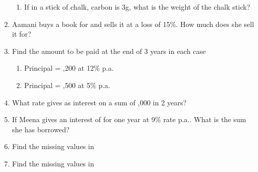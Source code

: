 \begin{enumerate}[label=\thesubsection.\arabic*,ref=\thesubsection.\theenumi,resume*]
\begin{enumerate}
		\item  If in a stick of chalk, carbon is 3g, what is the weight of the chalk stick?
	\end{enumerate}
\item Aamani buys a book for  and sells it at a loss of 15\%. How much does she sell it for?
\item  Find the amount to be paid at the end of 3 years in each case
	\begin{enumerate}
\item  Principal = ,200 at 12\% p.a.
\item  Principal = ,500 at 5\% p.a.
	\end{enumerate}
\item  What rate gives  as interest on a sum of ,000 in 2 years? 
\item  If Meena gives an interest of  for one year at 9\% rate p.a.. What is the sum she has borrowed?
\item	Find the missing values
	in
	\begin{table}[H]
  \centering
  
  \caption{}
  \label{tab:pgm}
\end{table}
\item	Find the missing values
	in
	\begin{table}[H]
  \centering
  
  \caption{}
  \label{tab:tri}
\end{table}
\end{enumerate}
